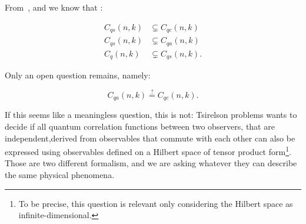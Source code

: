 From~\cite{ts1}, \cite{ts2} and \cite{ts3} we know that :

\begin{theorem}
    \begin{align}
    C_{q s}(n, k) &\subsetneq C_{q c}(n, k) \\
     C_{q s}(n, k) &\subsetneq C_{q a}(n, k) \\
    C_{q}(n, k) &\subsetneq C_{q s}(n, k).
    \end{align}
\end{theorem}

Only an open question remains, namely: 

\begin{problem}
    \begin{equation}
    C_{q a}(n, k) \stackrel{?}= C_{q c}(n, k).
    \end{equation}
\end{problem}

If this seems like a meaningless question, this is not: Tsirelson problems wants to decide if all quantum correlation functions between two observers, that are independent,derived from observables that commute with each other can also be expressed using observables defined on a Hilbert space of tensor product form\footnote{To be precise, this question is relevant only considering the Hilbert space as infinite-dimensional.}. Those are two different formalism, and we are asking whatever they can describe the same physical phenomena.